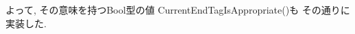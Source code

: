 \documentclass[uplatex,a4j]{jsreport}
\begin{document}
よって, その意味を持つBool型の値 CurrentEndTagIsAppropriate()も その通りに実装した.






\end{document}
